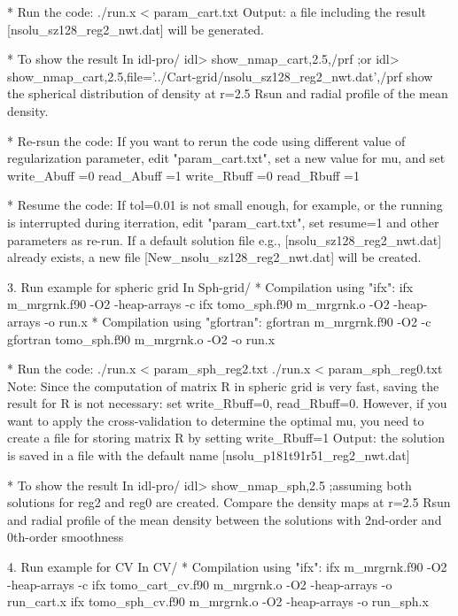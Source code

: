     * Run the code:
     ./run.x < param_cart.txt
    Output: a file including the result [nsolu_sz128_reg2_nwt.dat] will be generated.

    * To show the result
      In idl-pro/
      idl> show_nmap_cart,2.5,/prf  ;or
      idl> show_nmap_cart,2.5,file='../Cart-grid/nsolu_sz128_reg2_nwt.dat',/prf
      show the spherical distribution of density at r=2.5 Rsun and radial profile of 
      the mean density.

    * Re-rsun the code:
      If you want to rerun the code using different value of regularization parameter,
    edit "param_cart.txt", set a new value for mu, and set  
      write_Abuff =0
      read_Abuff =1
      write_Rbuff =0
      read_Rbuff =1
      
     * Resume the code:
     If tol=0.01 is not small enough, for example, or the running is interrupted during iterration,
      edit "param_cart.txt", set resume=1 and other parameters as re-run.
     If a default solution file e.g., [nsolu_sz128_reg2_nwt.dat] already exists, a new file 
      [New_nsolu_sz128_reg2_nwt.dat] will be created.

   3. Run example for spheric grid
     In Sph-grid/
     * Compilation using "ifx":
      ifx m_mrgrnk.f90 -O2 -heap-arrays -c
      ifx tomo_sph.f90 m_mrgrnk.o -O2 -heap-arrays -o run.x
     * Compilation using "gfortran":
      gfortran m_mrgrnk.f90 -O2  -c
      gfortran tomo_sph.f90 m_mrgrnk.o -O2  -o run.x

     * Run the code:
     ./run.x < param_sph_reg2.txt %
     ./run.x < param_sph_reg0.txt %
     Note: Since the computation of matrix R in spheric grid is very fast, saving the result
        for R is not necessary: set write_Rbuff=0, read_Rbuff=0. However, if you want to apply
        the cross-validation to determine the optimal mu, you need to create a file for storing
         matrix R by setting write_Rbuff=1
     Output: the solution is saved in a file with the default name [nsolu_p181t91r51_reg2_nwt.dat]

    * To show the result
      In idl-pro/
      idl> show_nmap_sph,2.5  ;assuming both solutions for reg2 and reg0 are created.
      Compare the density maps at r=2.5 Rsun and radial profile of the mean density between the 
      solutions with 2nd-order and 0th-order smoothness

   4. Run example for CV
     In CV/
      * Compilation using "ifx":
     ifx m_mrgrnk.f90 -O2 -heap-arrays -c
     ifx tomo_cart_cv.f90 m_mrgrnk.o -O2 -heap-arrays -o run_cart.x  %
     ifx tomo_sph_cv.f90 m_mrgrnk.o -O2 -heap-arrays -o run_sph.x    %
      
